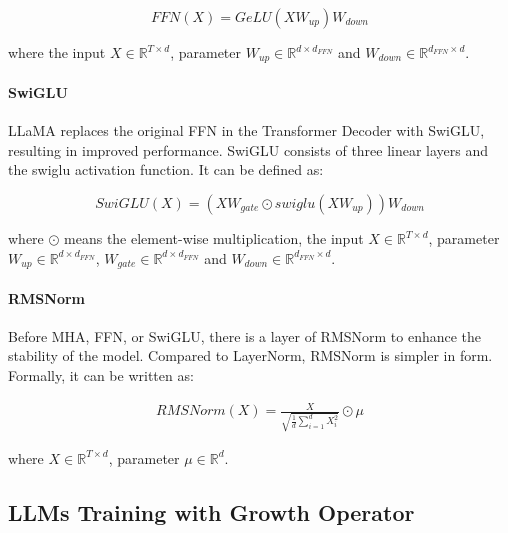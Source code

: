 \documentclass{article}
\begin{document}
\begin{equation}
    FFN(X) = GeLU(XW_{up})W_{down}
\end{equation}

where the input $X \in \mathbb{R}^{T \times d}$, parameter $W_{up} \in \mathbb{R}^{d \times d_{FFN}}$ and $W_{down} \in \mathbb{R}^{d_{FFN} \times d}$.

\paragraph{SwiGLU}

LLaMA replaces the original FFN in the Transformer Decoder with SwiGLU, resulting in improved performance. SwiGLU consists of three linear layers and the swiglu activation function. It can be defined as:

\begin{equation}
    SwiGLU(X) = (XW_{gate} \odot swiglu(XW_{up})) W_{down}
\end{equation}

where $\odot$ means the element-wise multiplication, the input $X \in \mathbb{R}^{T \times d}$, parameter $W_{up} \in \mathbb{R}^{d \times d_{FFN}}$, $W_{gate} \in \mathbb{R}^{d \times d_{FFN}}$ and $W_{down} \in \mathbb{R}^{d_{FFN} \times d}$.

\paragraph{RMSNorm}

Before MHA, FFN, or SwiGLU, there is a layer of RMSNorm to enhance the stability of the model. Compared to LayerNorm, RMSNorm is simpler in form. Formally, it can be written as:

\begin{eqnarray}
RMSNorm(X) = \frac{X}{\sqrt{\frac{1}{d}\sum_{i=1}^{d}X_i^2}} \odot \mu
\end{eqnarray}

where $X \in \mathbb{R}^{T \times d}$, parameter $\mu \in \mathbb{R}^d$.


\subsection{LLMs Training with Growth Operator}\label{app:model_growth}
\end{document}
